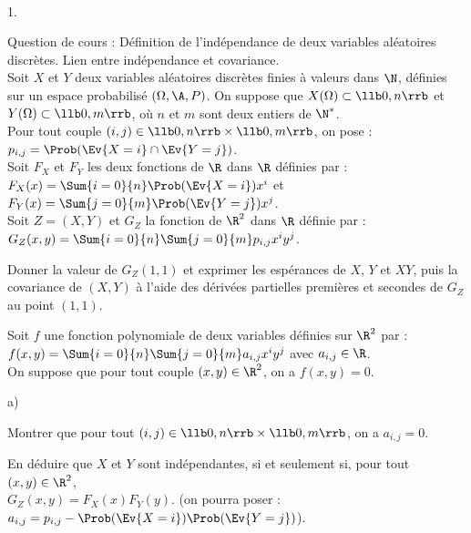 \documentclass[11pt]{article}%
\begin{document}
\begin{exerciceAP}~
  \begin{noliste}{1.}
    \setlength{\itemsep}{2mm}
  \item Question de cours : Définition de l'indépendance de deux
    variables aléatoires discrètes. Lien entre indépendance et
    covariance.\\
    Soit $X$ et $Y$ deux variables aléatoires discrètes finies à
    valeurs dans $\N$, définies sur un espace probabilisé
    $(\Omega,\A,P)$. On suppose que $X(\Omega)\subset \llb0,n\rrb$ et
    $Y(\Omega)\subset \llb0,m\rrb$, où $n$ et $m$ sont deux entiers de
    $\N^*$.\\
    Pour tout couple $(i,j)\in\llb0,n\rrb\times\llb0,m\rrb$, on pose :
    $p_{i,j}=\Prob(\Ev{X=i}\cap\Ev{Y=j})$.\\
    Soit $F_X$ et $F_Y$ les deux fonctions de $\R$ dans $\R$ définies
    par : $F_X(x)=\Sum{i=0}{n} \Prob(\Ev{X=i})x^i$ et \\
    $F_Y(x)=\Sum{j=0}{m} \Prob(\Ev{Y=j})x^j$.\\
    Soit $Z=(X,Y)$ et $G_Z$ la fonction de $\R^2$ dans $\R$ définie
    par : $G_Z(x,y)=\Sum{i=0}{n}\Sum{j=0}{m} p_{i,j}x^iy^j$.

  \item Donner la valeur de $G_Z(1,1)$ et exprimer les espérances de
    $X$, $Y$ et $XY$, puis la covariance de $(X,Y)$ à l'aide des
    dérivées partielles premières et secondes de $G_Z$ au point
    $(1,1)$.

  \item Soit $f$ une fonction polynomiale de deux variables définies
    sur $\R^2$ par : $f(x,y)=\Sum{i=0}{n}\Sum{j=0}{m} a_{i,j}x^iy^j$
    avec $a_{i,j}\in\R$.\\
    On suppose que pour tout couple $(x,y)\in\R^2$, on a $f(x,y)=0$.
    \begin{noliste}{a)}
    \setlength{\itemsep}{2mm}
    \item Montrer que pour tout
      $(i,j)\in\llb0,n\rrb\times\llb0,m\rrb$, on a $a_{i,j}=0$.
    \item En déduire que $X$ et $Y$ sont indépendantes, si et
      seulement si, pour tout $(x,y)\in\R^2$,\\
      $G_Z(x,y)=F_X(x)F_Y(y)$. (on pourra poser : $a_{i,j}=p_{i,j} -
      \Prob(\Ev{X=i})\Prob(\Ev{Y=j})$).
    \end{noliste}


\end{noliste}
\end{exerciceAP}
\end{document}
